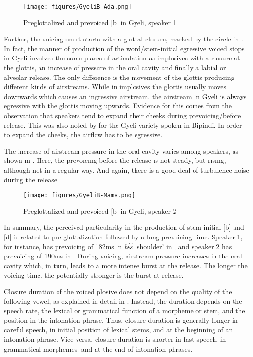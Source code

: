 \begin{figure}
\texttt{[image: figures/GyeliB-Ada.png]}
\caption{Preglottalized and prevoiced [b] in Gyeli, speaker 1}
\label{Fig:Implb}
\end{figure}

Further,  the voicing onset starts with a glottal closure, marked by the circle in . In fact, the manner of production of the word/stem-initial egressive voiced stops in Gyeli involves the same places of articulation as implosives with a closure at the glottis, an increase of pressure in the oral cavity and finally a labial or alveolar release. The only difference is the movement of the glottis producing different kinds of airstreams. While in implosives the glottis usually moves downwards which causes an ingressive airstream, the airstream in Gyeli is always egressive with the glottis moving upwards. Evidence for this comes from the observation that speakers tend to expand their cheeks during prevoicing/before release. This was also noted by \citet{renaud76} for the Gyeli variety spoken in Bipindi. In order to expand the cheeks, the airflow has to be egressive.

The increase of airstream pressure in the oral cavity varies among speakers, as shown in . Here, the prevoicing before the release is not steady, but rising, although not in a regular way. And again, there is a good deal of turbulence noise during the release.


\begin{figure}
\texttt{[image: figures/GyeliB-Mama.png]}
\caption{Preglottalized and prevoiced [b] in Gyeli, speaker 2}
\label{Fig:ImplbMama}
\end{figure}

In summary, the perceived particularity in the production of stem-initial [b] and [d] is related to pre-glottalization followed by a long prevoicing time. Speaker 1, for instance, has prevoicing of 182ms in {\itshape bɛ̀ɛ̀} `shoulder' in , and speaker 2 has prevoicing of 190ms in . During voicing, airstream pressure increases in the oral cavity which, in turn, leads to a more intense burst at the release.  The longer the voicing time, the potentially stronger is the burst at release.

Closure duration of the voiced plosive does not depend on the quality of the following vowel, as explained in detail in \citet{grimm2019}. Instead, the duration depends on the speech rate, the lexical or grammatical function of a morpheme or stem, and the position in the intonation phrase. Thus, closure duration is generally longer in careful speech, in initial position of lexical stems, and at the beginning of an intonation phrase. Vice versa, closure duration is shorter  in fast speech, in grammatical morphemes, and at the end of intonation phrases.


